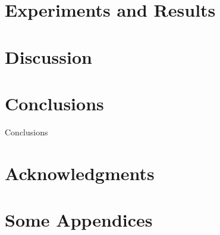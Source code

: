 \documentclass{sig-alternate-05-2015}
\begin{document}
\section{Experiments and Results}
\section{Discussion}

\section{Conclusions}
Conclusions

\section{Acknowledgments}

%

%
%
\appendix
\section{Some Appendices}
\end{document}

